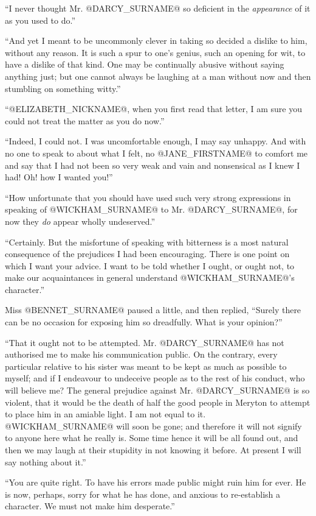``I never thought Mr. @DARCY_SURNAME@ so deficient in the \textit{appearance} of it as you
used to do.''

``And yet I meant to be uncommonly clever in taking so decided a dislike
to him, without any reason. It is such a spur to one's genius, such an
opening for wit, to have a dislike of that kind. One may be continually
abusive without saying anything just; but one cannot always be laughing
at a man without now and then stumbling on something witty.''

``@ELIZABETH_NICKNAME@, when you first read that letter, I am sure you could not treat
the matter as you do now.''

``Indeed, I could not. I was uncomfortable enough, I may say unhappy. And
with no one to speak to about what I felt, no @JANE_FIRSTNAME@ to comfort me and say
that I had not been so very weak and vain and nonsensical as I knew I
had! Oh! how I wanted you!''

``How unfortunate that you should have used such very strong expressions
in speaking of @WICKHAM_SURNAME@ to Mr. @DARCY_SURNAME@, for now they \textit{do} appear wholly
undeserved.''

``Certainly. But the misfortune of speaking with bitterness is a most
natural consequence of the prejudices I had been encouraging. There
is one point on which I want your advice. I want to be told whether I
ought, or ought not, to make our acquaintances in general understand
@WICKHAM_SURNAME@'s character.''

Miss @BENNET_SURNAME@ paused a little, and then replied, ``Surely there can be no
occasion for exposing him so dreadfully. What is your opinion?''

``That it ought not to be attempted. Mr. @DARCY_SURNAME@ has not authorised me
to make his communication public. On the contrary, every particular
relative to his sister was meant to be kept as much as possible to
myself; and if I endeavour to undeceive people as to the rest of his
conduct, who will believe me? The general prejudice against Mr. @DARCY_SURNAME@
is so violent, that it would be the death of half the good people in
Meryton to attempt to place him in an amiable light. I am not equal
to it. @WICKHAM_SURNAME@ will soon be gone; and therefore it will not signify to
anyone here what he really is. Some time hence it will be all found out,
and then we may laugh at their stupidity in not knowing it before. At
present I will say nothing about it.''

``You are quite right. To have his errors made public might ruin him for
ever. He is now, perhaps, sorry for what he has done, and anxious to
re-establish a character. We must not make him desperate.''

